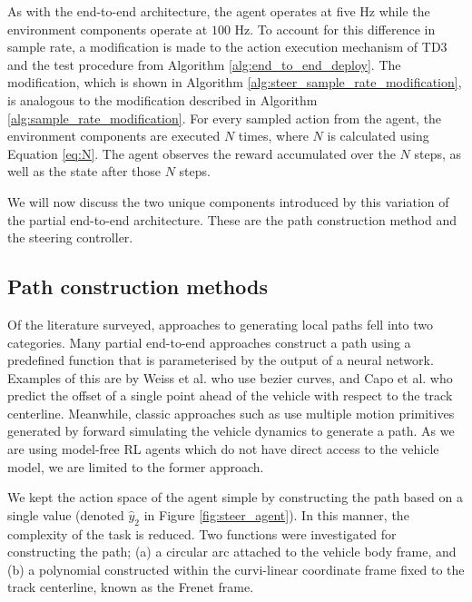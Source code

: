 As with the end-to-end architecture, the agent operates at five Hz while the environment components operate at $100$ Hz.
To account for this difference in sample rate, a modification is made to the action execution mechanism of TD3 and the test procedure from Algorithm \ref{alg:end_to_end_deploy}.
The modification, which is shown in Algorithm \ref{alg:steer_sample_rate_modification}, is analogous to the modification described in Algorithm \ref{alg:sample_rate_modification}.
For every sampled action from the agent, the environment components are executed $N$ times, where $N$ is calculated using Equation \ref{eq:N}.
The agent observes the reward accumulated over the $N$ steps, as well as the state after those $N$ steps.



We will now discuss the two unique components introduced by this variation of the partial end-to-end architecture.
These are the path construction method and the steering controller.

\subsection{Path construction methods}\label{sec:path_construction}
Of the literature surveyed, approaches to generating local paths fell into two categories. 
Many partial end-to-end approaches construct a path using a predefined function that is parameterised by the output of a neural network.
Examples of this are by Weiss et al. \cite{Weiss2020a} who use bezier curves, and Capo et al. \cite{Capo2020} who predict the offset of a single point ahead of the vehicle with respect to the track centerline.
Meanwhile, classic approaches such as \cite{keefer2022, Liniger2015a, Wang2021} use multiple motion primitives generated by forward simulating the vehicle dynamics to generate a path.
As we are using model-free RL agents which do not have direct access to the vehicle model, we are limited to the former approach.

We kept the action space of the agent simple by constructing the path based on a single value (denoted $\hat{y}_2$ in Figure \ref{fig:steer_agent}).
In this manner, the complexity of the task is reduced.
Two functions were investigated for constructing the path; (a) a circular arc attached to the vehicle body frame, and (b) a polynomial constructed within the curvi-linear coordinate frame fixed to the track centerline, known as the Frenet frame.

